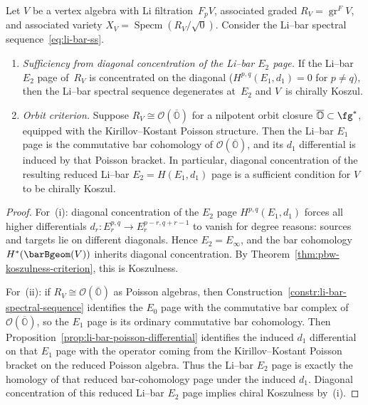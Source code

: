 \begin{theorem}
\label{thm:associated-variety-koszulness}

Let $V$ be a vertex algebra with Li filtration~$F_p V$,
associated graded $R_V = \operatorname{gr}^F V$, and
associated variety $X_V = \operatorname{Specm}(R_V/\!\sqrt{0})$.
Consider the Li--bar spectral sequence~\eqref{eq:li-bar-ss}.
\begin{enumerate}[label=\textup{(\roman*)}]
\item \emph{Sufficiency from diagonal concentration of the
 Li--bar $E_2$ page.}
 If the Li--bar $E_2$ page of~$R_V$
 is concentrated on the diagonal
 \textup{(}$H^{p,q}(E_1, d_1) = 0$ for
 $p \neq q$\textup{)}, then the Li--bar spectral sequence
 degenerates at~$E_2$ and $V$~is chirally Koszul.
\item \emph{Orbit criterion.}
 Suppose $R_V \cong \mathcal{O}(\overline{\mathbb{O}})$
 for a nilpotent orbit closure
 $\overline{\mathbb{O}} \subset \fg^*$, equipped with
 the Kirillov--Kostant Poisson structure. Then the Li--bar
 $E_1$ page is the commutative bar cohomology of
 $\mathcal{O}(\overline{\mathbb{O}})$, and its $d_1$
 differential is induced by that Poisson bracket. In
 particular, diagonal concentration of the resulting reduced
 Li--bar $E_2 = H(E_1,d_1)$ page is a sufficient condition
 for $V$ to be chirally Koszul.
\end{enumerate}
\end{theorem}

\begin{proof}
For~(i): diagonal concentration of the $E_2$ page
$H^{p,q}(E_1, d_1)$ forces all higher differentials
$d_r \colon E_r^{p,q} \to E_r^{p-r, q+r-1}$ to vanish
for degree reasons: sources and targets lie on different
diagonals. Hence $E_2 = E_\infty$, and the bar cohomology
$H^*(\barBgeom(V))$ inherits diagonal concentration. By
Theorem~\ref{thm:pbw-koszulness-criterion}, this is
Koszulness.

For~(ii): if $R_V \cong \mathcal{O}(\overline{\mathbb{O}})$ as
Poisson algebras, then
Construction~\ref{constr:li-bar-spectral-sequence}
identifies the $E_0$ page with the commutative bar complex of
$\mathcal{O}(\overline{\mathbb{O}})$, so the $E_1$ page is its
ordinary commutative bar cohomology. Then
Proposition~\ref{prop:li-bar-poisson-differential}
identifies the induced $d_1$ differential on that $E_1$ page
with the operator coming from the Kirillov--Kostant Poisson
bracket on the reduced Poisson algebra. Thus the Li--bar
$E_2$ page is exactly the homology of that reduced
bar-cohomology page under the induced $d_1$. Diagonal
concentration of this reduced Li--bar $E_2$ page implies
chiral Koszulness by~(i).
\end{proof}

